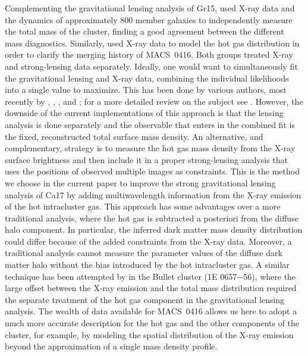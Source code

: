\documentclass[twocolumn]{aastex61}
\begin{document}
Complementing the gravitational lensing analysis of Gr15, \citet{Balestra2016}
used X-ray data and the dynamics of approximately $800$ member galaxies to
independently measure the total mass of the cluster, finding a good agreement
between the different mass diagnostics.
Similarly, \citet{Jauzac2015} used X-ray data to model the hot gas
distribution in order to clarify the merging history of MACS~0416.
Both groups treated X-ray and strong-lensing data separately.
Ideally, one would want to simultaneously fit the gravitational lensing and X-ray
data, combining the individual likelihoods into a single value to maximize.
This has been done by various authors, most recently by \citet{Morandi2012},
\citet{Umetsu2015}, \citet{Siegel2016}, and \citet{Sereno2017}; for a more detailed review on the
subject see \citet{Limousin2013}.
However, the downside of the current implementations of this approach is that the
lensing analysis is done separately and the observable that enters in the
combined fit is the fixed, reconstructed total surface mass density.
An alternative, and complementary, strategy is to measure the hot gas mass density from the X-ray surface
brightness and then include it in a proper strong-lensing analysis that uses
the positions of observed multiple images as constraints.
This is the method we choose in the current paper to improve the strong
gravitational lensing analysis of Ca17 by adding multiwavelength
information from the X-ray emission of the hot intracluster gas.
This approach has some advantages over a more traditional analysis,
where the hot gas is subtracted a posteriori from the diffuse halo component.
In particular, the inferred dark matter mass density distribution could differ because of the
added constraints from the X-ray data. Moreover, a traditional analysis cannot
measure the parameter values of the diffuse dark matter halo without the bias
introduced by the hot intracluster gas.
A similar technique has been attempted by \citet{Paraficz2016} in the Bullet
cluster (1E 0657$-$56), where the large offset between the X-ray emission and
the total mass distribution required the separate treatment of the hot gas
component in the gravitational lensing analysis.
The wealth of data available for MACS~0416 allows us here to adopt a
much more accurate description for the hot gas and the other components of the cluster,
for example, by modeling the spatial distribution of the X-ray emission beyond
the approximation of a single mass density profile.
\end{document}
